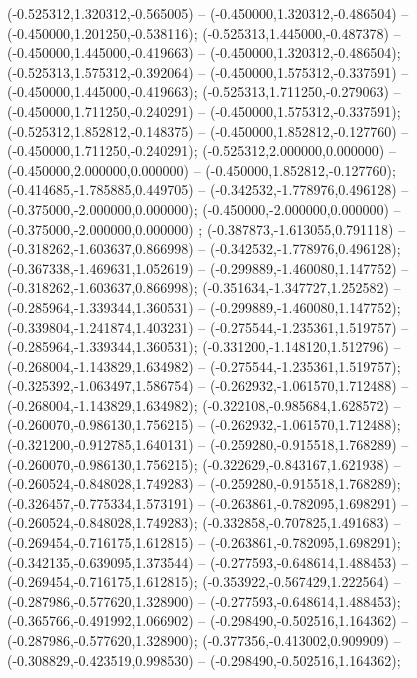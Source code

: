  (-0.525312,1.320312,-0.565005) -- (-0.450000,1.320312,-0.486504) -- (-0.450000,1.201250,-0.538116);
 (-0.525313,1.445000,-0.487378) -- (-0.450000,1.445000,-0.419663) -- (-0.450000,1.320312,-0.486504);
 (-0.525313,1.575312,-0.392064) -- (-0.450000,1.575312,-0.337591) -- (-0.450000,1.445000,-0.419663);
 (-0.525313,1.711250,-0.279063) -- (-0.450000,1.711250,-0.240291) -- (-0.450000,1.575312,-0.337591);
 (-0.525312,1.852812,-0.148375) -- (-0.450000,1.852812,-0.127760) -- (-0.450000,1.711250,-0.240291);
 (-0.525312,2.000000,0.000000) -- (-0.450000,2.000000,0.000000) -- (-0.450000,1.852812,-0.127760);
 (-0.414685,-1.785885,0.449705) -- (-0.342532,-1.778976,0.496128) -- (-0.375000,-2.000000,0.000000);
 (-0.450000,-2.000000,0.000000) -- (-0.375000,-2.000000,0.000000) ;
 (-0.387873,-1.613055,0.791118) -- (-0.318262,-1.603637,0.866998) -- (-0.342532,-1.778976,0.496128);
 (-0.367338,-1.469631,1.052619) -- (-0.299889,-1.460080,1.147752) -- (-0.318262,-1.603637,0.866998);
 (-0.351634,-1.347727,1.252582) -- (-0.285964,-1.339344,1.360531) -- (-0.299889,-1.460080,1.147752);
 (-0.339804,-1.241874,1.403231) -- (-0.275544,-1.235361,1.519757) -- (-0.285964,-1.339344,1.360531);
 (-0.331200,-1.148120,1.512796) -- (-0.268004,-1.143829,1.634982) -- (-0.275544,-1.235361,1.519757);
 (-0.325392,-1.063497,1.586754) -- (-0.262932,-1.061570,1.712488) -- (-0.268004,-1.143829,1.634982);
 (-0.322108,-0.985684,1.628572) -- (-0.260070,-0.986130,1.756215) -- (-0.262932,-1.061570,1.712488);
 (-0.321200,-0.912785,1.640131) -- (-0.259280,-0.915518,1.768289) -- (-0.260070,-0.986130,1.756215);
 (-0.322629,-0.843167,1.621938) -- (-0.260524,-0.848028,1.749283) -- (-0.259280,-0.915518,1.768289);
 (-0.326457,-0.775334,1.573191) -- (-0.263861,-0.782095,1.698291) -- (-0.260524,-0.848028,1.749283);
 (-0.332858,-0.707825,1.491683) -- (-0.269454,-0.716175,1.612815) -- (-0.263861,-0.782095,1.698291);
 (-0.342135,-0.639095,1.373544) -- (-0.277593,-0.648614,1.488453) -- (-0.269454,-0.716175,1.612815);
 (-0.353922,-0.567429,1.222564) -- (-0.287986,-0.577620,1.328900) -- (-0.277593,-0.648614,1.488453);
 (-0.365766,-0.491992,1.066902) -- (-0.298490,-0.502516,1.164362) -- (-0.287986,-0.577620,1.328900);
 (-0.377356,-0.413002,0.909909) -- (-0.308829,-0.423519,0.998530) -- (-0.298490,-0.502516,1.164362);
